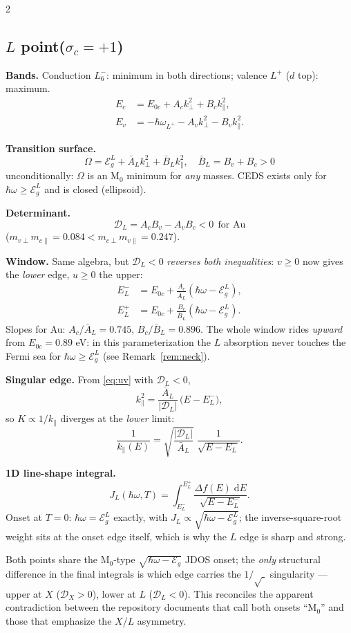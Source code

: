 \documentclass[11pt,a4paper]{article}
\numberwithin{equation}{section}
\newcommand{\hw}{\hbar\omega}
\newcommand{\Eg}{\mathcal{E}_g}
\newcommand{\EgL}{\mathcal{E}_g^{L}}
\newcommand{\cD}{\mathcal{D}}
\newcommand{\Ab}{\bar{A}}
\newcommand{\Bb}{\bar{B}}
\newcommand{\kperp}{k_{\perp}}
\newcommand{\kpar}{k_{\parallel}}
\newcommand{\dd}{\mathrm{d}}
\newcommand{\Ec}{E_c}
\newcommand{\Ev}{E_v}
\newcommand{\Ezc}{E_{0c}}
\begin{document}
\begin{paracol}{2}
\begin{rightcolumn}
\subsection*{$L$ point\quad ($\sigma_c=+1$)}

\textbf{Bands.} Conduction $L_6^-$: minimum in both directions;
valence $L^+$ ($d$ top): maximum.
\begin{align*}
\Ec&=\Ezc+A_c\kperp^2+B_c\kpar^2,\\
\Ev&=-\hbar\omega_{L^+}-A_v\kperp^2-B_v\kpar^2 .
\end{align*}

\textbf{Transition surface.}
\[
\Omega=\EgL+\Ab_L\kperp^2+\Bb_L\kpar^2,\quad
\Bb_L=B_v+B_c>0
\]
unconditionally: $\Omega$ is an M$_0$ minimum for \emph{any} masses.
CEDS exists only for $\hw\ge\EgL$ and is closed (ellipsoid).

\textbf{Determinant.}
\[
\cD_L=A_cB_v-A_vB_c<0\ \ \text{for Au}
\]
($m_{v\perp}m_{c\parallel}=0.084<m_{c\perp}m_{v\parallel}=0.247$).

\textbf{Window.}  Same algebra, but $\cD_L<0$ \emph{reverses both
inequalities}: $v\ge0$ now gives the \emph{lower} edge, $u\ge0$ the
upper:
\begin{align*}
E^{-}_L&=\Ezc+\frac{A_c}{\Ab_L}(\hw-\EgL),\\
E^{+}_L&=\Ezc+\frac{B_c}{\Bb_L}(\hw-\EgL).
\end{align*}
Slopes for Au: $A_c/\Ab_L=0.745$, $B_c/\Bb_L=0.896$.  The whole
window rides \emph{upward} from $\Ezc=0.89$ eV: in this
parameterization the $L$ absorption never touches the Fermi sea for
$\hw\ge\EgL$ (see Remark~\ref{rem:neck}).

\textbf{Singular edge.}  From \eqref{eq:uv} with $\cD_L<0$,
\[
\kpar^{2}=\frac{\Ab_L}{|\cD_L|}\,\bigl(E-E^{-}_L\bigr),
\]
so $K\propto1/\kpar$ diverges at the \emph{lower} limit:
\[
\frac{1}{\kpar(E)}=\sqrt{\frac{|\cD_L|}{\Ab_L}}\;
\frac{1}{\sqrt{E-E^{-}_L}} .
\]

\textbf{1D line-shape integral.}
\[
J_L(\hw,T)=\int_{E^{-}_L}^{E^{+}_L}
\frac{\Delta f(E)\;\dd E}{\sqrt{E-E^{-}_L}} .
\]
Onset at $T=0$: $\hw=\EgL$ exactly, with
$J_L\propto\sqrt{\hw-\EgL}$; the inverse-square-root weight sits at
the onset edge itself, which is why the $L$ edge is sharp and strong.
\end{rightcolumn}

\end{paracol}

\medskip
\noindent
Both points share the M$_0$-type $\sqrt{\hw-\Eg}$ JDOS onset; the
\emph{only} structural difference in the final integrals is which edge
carries the $1/\sqrt{\;}$ singularity --- upper at $X$
($\cD_X>0$), lower at $L$ ($\cD_L<0$).  This reconciles the apparent
contradiction between the repository documents that call both onsets
``M$_0$'' and those that emphasize the $X$/$L$ asymmetry.
\end{document}
